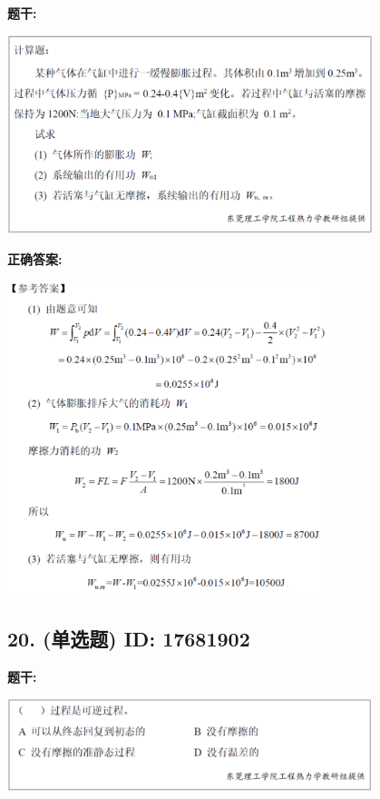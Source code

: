 \documentclass[12pt]{article}
\begin{document}
\textbf{题干:}


\begin{center}\includegraphics[width=0.8\textwidth, height=0.25\textheight, keepaspectratio]{question_19_17681926/title_img_1.png}\end{center}

\textbf{正确答案:}

\begin{center}\includegraphics[width=0.7\textwidth, height=0.2\textheight, keepaspectratio]{question_19_17681926/correct_answer_1_img_1.png}\end{center}

\vspace{0.5em}\hrulefill\vspace{1em}

\subsection*{20. (单选题) \small ID: 17681902}

\textbf{题干:}


\begin{center}\includegraphics[width=0.8\textwidth, height=0.25\textheight, keepaspectratio]{question_20_17681902/title_img_1.png}\end{center}
\end{document}
